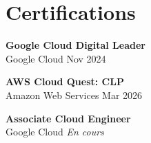 \section{\icon{\faCertificate} Certifications}

\begin{minipage}[t]{0.32\textwidth}
  \textbf{\color{accent}Google Cloud Digital Leader}\\
  \textcolor{muted}{\small Google Cloud \hfill Nov 2024}
\end{minipage}
\hfill
\begin{minipage}[t]{0.32\textwidth}
  \textbf{\color{accent}AWS Cloud Quest: CLP}\\
  \textcolor{muted}{\small Amazon Web Services \hfill Mar 2026}
\end{minipage}
\hfill
\begin{minipage}[t]{0.32\textwidth}
  \textbf{\color{accent}Associate Cloud Engineer}\\
  \textcolor{muted}{\small Google Cloud \hfill \textit{En cours}}
\end{minipage}
